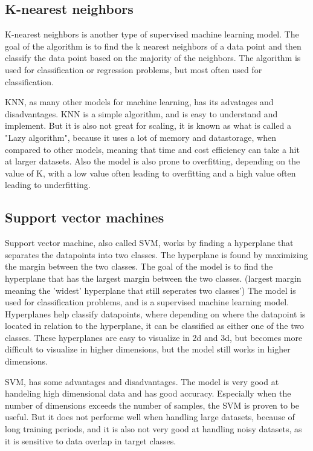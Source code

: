 \subsection{K-nearest neighbors}
K-nearest neighbors is another type of supervised machine learning model. The goal of the algorithm is to find the k nearest neighbors of a data point and then classify the data point based on the majority of the neighbors. The algorithm is used for classification or regression problems, but most often used for classification.\cite{K-NearestNeighborsIBM}

KNN, as many other models for machine learning, has its advatages and disadvantages. KNN is a simple algorithm, and is easy to understand and implement. But it is also not great for scaling, it is known as what is called a "Lazy algorithm", because it uses a lot of memory and datastorage, when compared to other models, meaning that time and cost efficiency can take a hit at larger datasets. Also the model is also prone to overfitting, depending on the value of K, with a low value often leading to overfitting and a high value often leading to underfitting. \cite{K-NearestNeighborsIBM}

\subsection{Support vector machines}
Support vector machine, also called SVM, works by finding a hyperplane that separates the datapoints into two classes. The hyperplane is found by maximizing the margin between the two classes. The goal of the model is to find the hyperplane that has the largest margin between the two classes. (largest margin meaning the 'widest' hyperplane that still seperates two classes') The model is used for classification problems, and is a supervised machine learning model. Hyperplanes help classify datapoints, where depending on where the datapoint is located in relation to the hyperplane, it can be classified as either one of the two classes. These hyperplanes are easy to visualize in 2d and 3d, but becomes more difficult to visualize in higher dimensions, but the model still works in higher dimensions.\cite{SupportVectorMachines}

SVM, has some advantages and disadvantages. The model is very good at handeling high dimensional data and has good accuracy. Especially when the number of dimensions exceeds the number of samples, the SVM is proven to be useful.
But it does not performe well when handling large datasets, because of long training periods, and it is also not very good at handling noisy datasets, as it is sensitive to data overlap in target classes.\cite{SVMProsAndCons}


